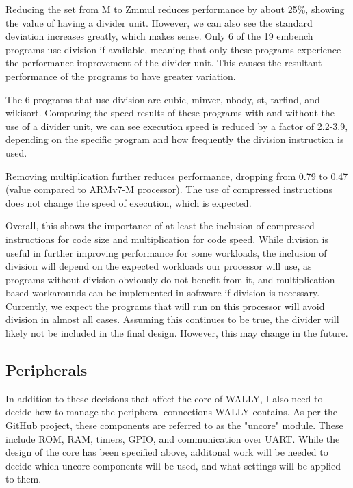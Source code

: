 \documentclass[conference]{IEEEtran}
\begin{document}
Reducing the set from M to Zmmul reduces performance by about 25\%, showing the value of having a divider unit. However, we can also see the standard deviation increases greatly, which makes sense. Only 6 of the 19 embench programs use division if available, meaning that only these programs experience the performance improvement of the divider unit. This causes the resultant performance of the programs to have greater variation.

The 6 programs that use division are cubic, minver, nbody, st, tarfind, and wikisort. Comparing the speed results of these programs with and without the use of a divider unit, we can see execution speed is reduced by a factor of 2.2-3.9, depending on the specific program and how frequently the division instruction is used.

Removing multiplication further reduces performance, dropping from 0.79 to 0.47 (value compared to ARMv7-M processor). The use of compressed instructions does not change the speed of execution, which is expected.

Overall, this shows the importance of at least the inclusion of compressed instructions for code size and multiplication for code speed. While division is useful in further improving performance for some workloads, the inclusion of division will depend on the expected workloads our processor will use, as programs without division obviously do not benefit from it, and multiplication-based workarounds can be implemented in software if division is necessary. Currently, we expect the programs that will run on this processor will avoid division in almost all cases. Assuming this continues to be true, the divider will likely not be included in the final design. However, this may change in the future.

\subsection{Peripherals}
In addition to these decisions that affect the core of WALLY, I also need to decide how to manage the peripheral connections WALLY contains. As per the GitHub project, these components are referred to as the "uncore" module. These include ROM, RAM, timers, GPIO, and communication over UART. While the design of the core has been specified above, additonal work will be needed to decide which uncore components will be used, and what settings will be applied to them.
\end{document}
